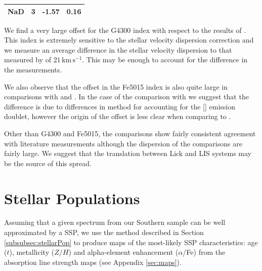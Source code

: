 \documentclass[a4paper,fleqn,usenatbib]{mnras}
\begin{document}
\begin{table}
\begin{tabular}{l r r r}
				NaD 		& 3 		& -1.57\leavevmode\phantom{0}& 0.16\leavevmode\phantom{0}	\\
				\hline
				\hline
			\end{tabular}
		\end{table}

		We find a very large offset for the G4300 index with respect to the results of \citet{Rampazzo2005}. This index is extremely sensitive to the stellar velocity dispersion correction and we measure an average difference in the stellar velocity dispersion to that measured by \citet{Rampazzo2005} of $21\,\mathrm{km\,s^{-1}}$. This may be enough to account for the difference in the measurements.

		We also observe that the offset in the Fe5015 index is also quite large in comparisons with \citet{Rampazzo2005} and \citet{Vazdekis2010}. In the case of the comparison with \citet{Rampazzo2005} we suggest that the difference is due to differences in method for accounting for the [] emission doublet, however the origin of the offset is less clear when comparing to \citet{Vazdekis2010}. 

		Other than G4300 and Fe5015, the comparisons show fairly consistent agreement with literature measurements although the dispersion of the comparisons are fairly large. We suggest that the translation between Lick and LIS systems may be the source of this spread.

\section{Stellar Populations}
	\label{sec:stellarPop}
	Assuming that a given spectrum from our Southern sample can be well approximated by a SSP, we use the method described in Section \ref{subsubsec:stellarPop} to produce maps of the most-likely SSP characteristics: age ($t$), metallicity ($Z/H$) and alpha-element enhancement ($\alpha$/Fe) from the absorption line strength maps (see Appendix \ref{sec:maps}).
\end{document}
